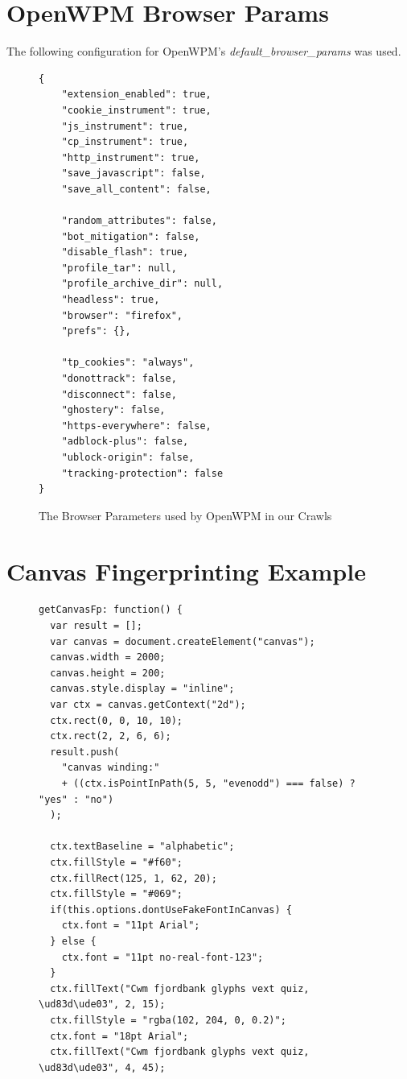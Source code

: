 \documentclass[
    fontsize=12pt,
    headings=small,
    parskip=half,
    bibliography=totoc,
    numbers=noenddot,
    open=any
    ]{scrreprt}
\begin{document}
\begin{appendices}

\chapter{OpenWPM Browser Params}
The following configuration for OpenWPM's \textit{default\_browser\_params} was used.



\begin{figure}
\label{app:params}
\begin{verbatim}
{
    "extension_enabled": true,
    "cookie_instrument": true,
    "js_instrument": true,
    "cp_instrument": true,
    "http_instrument": true,
    "save_javascript": false,
    "save_all_content": false,

    "random_attributes": false,
    "bot_mitigation": false,
    "disable_flash": true,
    "profile_tar": null,
    "profile_archive_dir": null,
    "headless": true,
    "browser": "firefox",
    "prefs": {},

    "tp_cookies": "always",
    "donottrack": false,
    "disconnect": false,
    "ghostery": false,
    "https-everywhere": false,
    "adblock-plus": false,
    "ublock-origin": false,
    "tracking-protection": false
}
\end{verbatim}
\caption{The Browser Parameters used by OpenWPM in our Crawls}
\end{figure}


\chapter{Canvas Fingerprinting Example}
\begin{figure}
\begin{verbatim}
getCanvasFp: function() {
  var result = [];
  var canvas = document.createElement("canvas");
  canvas.width = 2000;
  canvas.height = 200;
  canvas.style.display = "inline";
  var ctx = canvas.getContext("2d");
  ctx.rect(0, 0, 10, 10);
  ctx.rect(2, 2, 6, 6);
  result.push(
    "canvas winding:"
    + ((ctx.isPointInPath(5, 5, "evenodd") === false) ? "yes" : "no")
  );

  ctx.textBaseline = "alphabetic";
  ctx.fillStyle = "#f60";
  ctx.fillRect(125, 1, 62, 20);
  ctx.fillStyle = "#069";
  if(this.options.dontUseFakeFontInCanvas) {
    ctx.font = "11pt Arial";
  } else {
    ctx.font = "11pt no-real-font-123";
  }
  ctx.fillText("Cwm fjordbank glyphs vext quiz, \ud83d\ude03", 2, 15);
  ctx.fillStyle = "rgba(102, 204, 0, 0.2)";
  ctx.font = "18pt Arial";
  ctx.fillText("Cwm fjordbank glyphs vext quiz, \ud83d\ude03", 4, 45);


\end{verbatim}
\end{figure}
\end{appendices}
\end{document}
